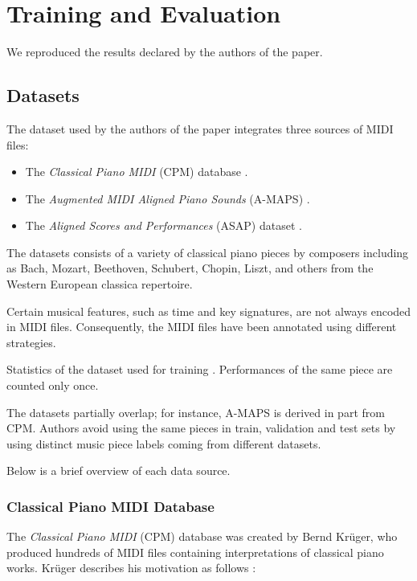 \section{Training and Evaluation}

We reproduced the results declared by the authors of the paper.

\subsection{Datasets}

The dataset used by the authors of the paper \cite{Liu2022} integrates three sources of MIDI files: \begin{itemize}
	\item The \emph{Classical Piano MIDI} (CPM) database \cite{Krueger1996}.
	\item The \emph{Augmented MIDI Aligned Piano Sounds} (A-MAPS) \cite{Ycart2018}.
	\item The \emph{Aligned Scores and Performances} (ASAP) dataset \cite{Foscarin2020}.
\end{itemize}

The datasets consists of a variety of classical piano pieces by composers including as Bach, Mozart, Beethoven, Schubert, Chopin, Liszt, and others from the Western European classica repertoire.

Certain musical features, such as time and key signatures, are not always encoded in MIDI files. Consequently, the MIDI files have been annotated using different strategies.

\begin{table}[ht!]
\centering

\caption[Statistics of the dataset used for training]{Statistics of the dataset used for training \cite{Liu2022}. Performances of the same piece are counted only once.}
\end{table}

The datasets partially overlap; for instance, A-MAPS is derived in part from CPM. Authors avoid using the same pieces in train, validation and test sets by using distinct music piece labels coming from different datasets.

Below is a brief overview of each data source.

\subsubsection{Classical Piano MIDI Database}

The \emph{Classical Piano MIDI} (CPM) database was created by Bernd Krüger, who produced hundreds of MIDI files containing interpretations of classical piano works. Krüger describes his motivation as follows \cite{Krueger1996}:

